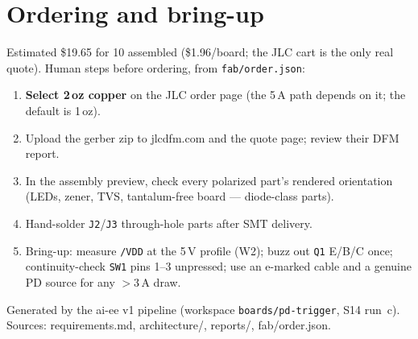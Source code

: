 \documentclass[11pt,a4paper]{article}
\newcommand{\net}[1]{\texttt{#1}}
\begin{document}
\section{Ordering and bring-up}
Estimated \$19.65 for 10 assembled (\$1.96/board; the JLC cart is the only
real quote). Human steps before ordering, from \texttt{fab/order.json}:
\begin{enumerate}\itemsep2pt
  \item \textbf{Select 2\,oz copper} on the JLC order page (the 5\,A path
  depends on it; the default is 1\,oz).
  \item Upload the gerber zip to jlcdfm.com and the quote page; review
  their DFM report.
  \item In the assembly preview, check every polarized part's rendered
  orientation (LEDs, zener, TVS, tantalum-free board --- diode-class parts).
  \item Hand-solder \net{J2}/\net{J3} through-hole parts after SMT delivery.
  \item Bring-up: measure \net{/VDD} at the 5\,V profile (W2); buzz out
  \net{Q1} E/B/C once; continuity-check \net{SW1} pins 1--3 unpressed;
  use an e-marked cable and a genuine PD source for any $>$3\,A draw.
\end{enumerate}

\vfill
\begin{center}\footnotesize\color{gray}
Generated by the ai-ee v1 pipeline (workspace \texttt{boards/pd-trigger},
S14 run~c). Sources: requirements.md, architecture/, reports/, fab/order.json.
\end{center}
\end{document}
